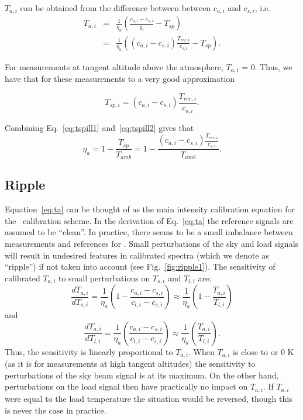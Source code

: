 \(T_{a,i}\) can be obtained from the difference between between
\(c_{a,i}\) and \(c_{s,i}\), i.e.
\begin{eqnarray}
\label{eq:ta}
T_{a,i} &=& \frac{1}{\eta_{a}}\left(\frac{c_{a,i}-c_{s,i}}{g_{i}} - T_{sp}\right) \nonumber\\
 &=& \frac{1}{\eta_{a}}\left( \left(c_{a,i} - c_{s,i}\right)\frac{T_{rec,i}}{c_{s,i}} -T_{sp} \right). 
\end{eqnarray}

For measurements at tangent altitude above the atmosphere,
\(T_{a,i}\) = 0. Thus, we have that for these measurements
to a very good approximation

\begin{equation}
\label{eq:tspill2}
T_{sp,i}= \left(c_{a,i}-c_{s,i}\right)\frac{T_{rec,i}}{c_{s,i}}.
\end{equation}

Combining Eq.~\ref{eq:tspill1} and~\ref{eq:tspill2} gives that
\begin{equation}
\label{eq:eta}
\eta_{a}=1-\frac{T_{sp}}{T_{amb}}=1-\frac{\left(c_{a,i}-c_{s,i}\right)\frac{T_{rec,i}}{c_{s,i}}}{T_{amb}}.
\end{equation}

\subsection{Ripple}
\label{sec:ripples}
Equation~\ref{eq:ta} can be thought of as the main intensity
calibration equation for the \smr\ calibration scheme.
In the derivation of Eq.~\ref{eq:ta}
the reference signals are assumed to be ``clean''.
In practice, there seems to be a small imbalance between 
measurements and references for \smr. 
Small perturbations of the sky and load signals will
result in undesired features in calibrated
spectra (which we denote as ``ripple'') 
if not taken into account (see Fig.~\ref{fig:ripple1}).
The sensitivity of calibrated \(T_{a,i}\) 
to small perturbations on \(T_{s,i}\) and \(T_{l,i}\) are:
\begin{equation}
\frac{dT_{a,i}}{dT_{s,i}}=\frac{1}{\eta_{a}}\left(1-\frac{c_{a,i}-c_{s,i}}{c_{l,i}-c_{s,i}}\right)\approx \frac{1}{\eta_{a}}\left(1-\frac{T_{a,i}}{T_{l,i}}\right)
\end{equation}
and
\begin{equation}
\frac{dT_{a,i}}{dT_{l,i}}=\frac{1}{\eta_{a}}\left(\frac{c_{a,i}-c_{s,i}}{c_{l,i}-c_{s,i}}\right)\approx \frac{1}{\eta_{a}}\left(\frac{T_{a,i}}{T_{l,i}}\right).
\end{equation}
Thus, the sensitivity is linearly proportional to \(T_{a,i}\).
When \(T_{a,i}\) is close to or 0 K (as it is for measurements at high
tangent altitudes) the sensitivity to perturbations of
the sky beam signal is at its maximum.
On the other hand, perturbations on the load signal then have practically
no impact on \(T_{a,i}\).
If \(T_{a,i}\) were equal to the load temperature the situation would be reversed,
though this is never the case in practice.

